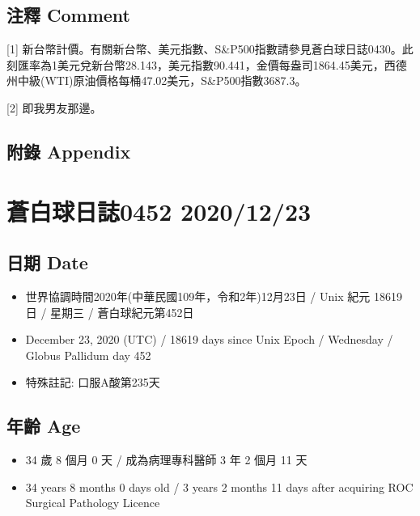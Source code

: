 \documentclass[
]{article}
\providecommand{\tightlist}{%
  \setlength{\itemsep}{0pt}\setlength{\parskip}{0pt}}
\begin{document}
\hypertarget{ux6ce8ux91cb-comment-21}{%
\subsection{注釋 Comment}\label{ux6ce8ux91cb-comment-21}}

{[}1{]}
新台幣計價。有關新台幣、美元指數、S\&P500指數請參見蒼白球日誌0430。此刻匯率為1美元兌新台幣28.143，美元指數90.441，金價每盎司1864.45美元，西德州中級(WTI)原油價格每桶47.02美元，S\&P500指數3687.3。

{[}2{]} 即我男友那邊。

\hypertarget{ux9644ux9304-appendix-21}{%
\subsection{附錄 Appendix}\label{ux9644ux9304-appendix-21}}

\hypertarget{ux84bcux767dux7403ux65e5ux8a8c0452-20201223}{%
\section{蒼白球日誌0452
2020/12/23}\label{ux84bcux767dux7403ux65e5ux8a8c0452-20201223}}

\hypertarget{ux65e5ux671f-date-22}{%
\subsection{日期 Date}\label{ux65e5ux671f-date-22}}

\begin{itemize}
\tightlist
\item
  世界協調時間2020年(中華民國109年，令和2年)12月23日 / Unix 紀元 18619
  日 / 星期三 / 蒼白球紀元第452日
\item
  December 23, 2020 (UTC) / 18619 days since Unix Epoch / Wednesday /
  Globus Pallidum day 452
\item
  特殊註記: 口服A酸第235天
\end{itemize}

\hypertarget{ux5e74ux9f61-age-22}{%
\subsection{年齡 Age}\label{ux5e74ux9f61-age-22}}

\begin{itemize}
\tightlist
\item
  34 歲 8 個月 0 天 / 成為病理專科醫師 3 年 2 個月 11 天
\item
  34 years 8 months 0 days old / 3 years 2 months 11 days after
  acquiring ROC Surgical Pathology Licence
\end{itemize}
\end{document}

